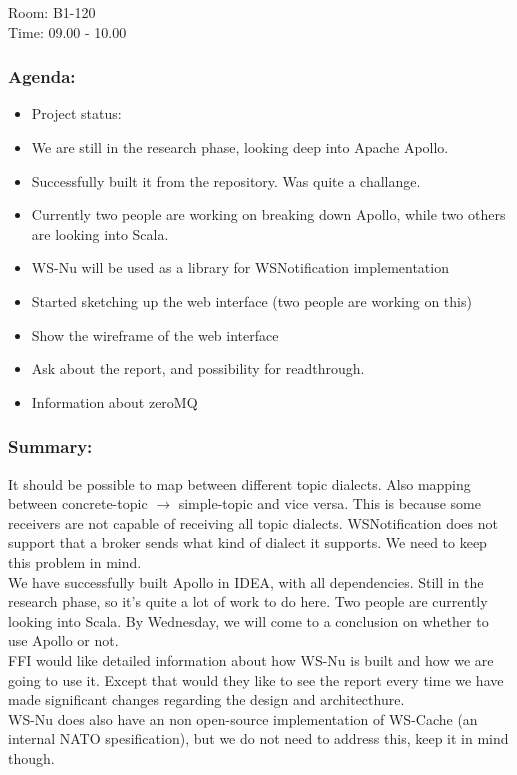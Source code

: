 Room: B1-120 \\
\noindent Time: 09.00 - 10.00

\subsubsection*{Agenda:}
\begin{itemize}
\setlength{\itemsep}{0cm}%
\item Project status:
\item We are still in the research phase, looking deep into Apache Apollo.
\item Successfully built it from the repository. Was quite a challange. 
\item Currently two people are working on breaking down Apollo, while two others are looking into Scala. 
\item WS-Nu will be used as a library for WSNotification implementation
\item Started sketching up the web interface (two people are working on this)
\item Show the wireframe of the web interface
\item Ask about the report, and possibility for readthrough. 
\item Information about zeroMQ
\end{itemize}

\subsubsection*{Summary:} 
It should be possible to map between different topic dialects. Also mapping between concrete-topic $\rightarrow$ simple-topic and vice versa. This is because some receivers are not capable of receiving all topic dialects. WSNotification does not support that a broker sends what kind of dialect it supports. We need to keep this problem in mind. \\

\noindent We have successfully built Apollo in IDEA, with all dependencies. Still in the research phase, so it’s quite a lot of work to do here. Two people are currently looking into Scala. By Wednesday, we will come to a conclusion on whether to use Apollo or not. \\

\noindent FFI would like detailed information about how WS-Nu is built and how we are going to use it. Except that would they like to see the report every time we have made significant changes regarding the design and architecthure. \\


\noindent WS-Nu does also have an non open-source implementation of WS-Cache (an internal NATO spesification),  but we do not need to address this, keep it in mind though. \\

\clearpage